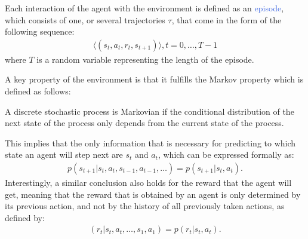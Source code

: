 Each interaction of the agent with the environment is defined as an \textcolor{RoyalBlue}{episode}, which consists of one, or several trajectories $\tau$, that come in the form of the following sequence:
\begin{align}
	\langle(s_t,a_t,r_t,s_{t+1})\rangle,t=0,\ldots,T-1
\end{align}
where $T$ is a random variable representing the length of the episode.

A key property of the environment is that it fulfills the Markov property which is defined as follows:
\begin{definition}
	A discrete stochastic process is Markovian if the conditional distribution of the next state of the process only depends from the current state of the process.
\end{definition}
This implies that the only information that is necessary for predicting to which state an agent will step next are $s_t$ and $a_t$, which can be expressed formally as:
\begin{align}
	p(s_{t+1}|s_t, a_t, s_{t-1}, a_{t-1}, \ldots) = p(s_{t+1} | s_t, a_t).
\end{align}
Interestingly, a similar conclusion also holds for the reward that the agent will get, meaning that the reward that is obtained by an agent is only determined by its previous action, and not by the history of all previously taken actions, as defined by:
\begin{align}
	(r_t| s_t, a_t, \ldots, s_1, a_1) = p(r_t|s_t,a_t).
\end{align}


